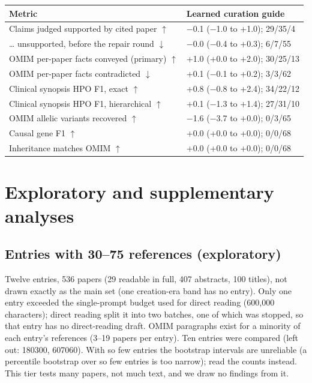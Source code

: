 \documentclass{article} %
\begin{document}
\begin{table}[!htbp]
\begin{tabularx}{\linewidth}{>{\raggedright\arraybackslash}p{4.0cm}>{\centering\arraybackslash}X}
\toprule
Metric & Learned curation guide \\
\midrule
Claims judged supported by cited paper $\uparrow$ & $-$0.1 ($-$1.0 to +1.0); 29/35/4 \\
\ldots{} unsupported, before the repair round $\downarrow$ & $-$0.0 ($-$0.4 to +0.3); 6/7/55 \\
OMIM per-paper facts conveyed (primary) $\uparrow$ & +1.0 (+0.0 to +2.0); 30/25/13 \\
OMIM per-paper facts contradicted $\downarrow$ & +0.1 ($-$0.1 to +0.2); 3/3/62 \\
Clinical synopsis HPO F1, exact $\uparrow$ & +0.8 ($-$0.8 to +2.4); 34/22/12 \\
Clinical synopsis HPO F1, hierarchical $\uparrow$ & +0.1 ($-$1.3 to +1.4); 27/31/10 \\
OMIM allelic variants recovered $\uparrow$ & $-$1.6 ($-$3.7 to +0.0); 0/3/65 \\
Causal gene F1 $\uparrow$ & +0.0 (+0.0 to +0.0); 0/0/68 \\
Inheritance matches OMIM $\uparrow$ & +0.0 (+0.0 to +0.0); 0/0/68 \\
\bottomrule
\end{tabularx}
\end{table}

\FloatBarrier
\section{Exploratory and supplementary analyses}
\FloatBarrier
\subsection{Entries with 30--75 references (exploratory)}
\label{app:large}
Twelve entries, 536 papers (29 readable in full, 407 abstracts, 100 titles), not drawn exactly as the main set (one creation-era band has no entry). Only one entry exceeded the single-prompt budget used for direct reading (600,000 characters); direct reading split it into two batches, one of which was stopped, so that entry has no direct-reading draft. OMIM paragraphs exist for a minority of each entry's references (3--19 papers per entry). Ten entries were compared (left out: 180300, 607060). With so few entries the bootstrap intervals are unreliable (a percentile bootstrap over so few entries is too narrow); read the counts instead. This tier tests many papers, not much text, and we draw no findings from it.
\end{document}
